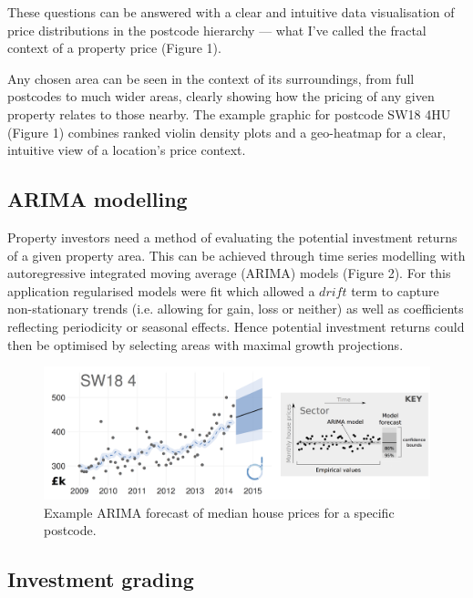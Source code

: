 \documentclass[
10pt, %
a4paper, %
oneside, %
headinclude,footinclude, %
BCOR5mm, %
]{scrartcl}
\begin{document}

These questions can be answered with a clear and intuitive data
visualisation of price distributions in the postcode hierarchy --- what
I've called the fractal context of a property price (Figure 1).

Any chosen area can be seen in the context of its surroundings, from
full postcodes to much wider areas, clearly showing how the pricing of
any given property relates to those nearby.  The example graphic for
postcode SW18 4HU (Figure 1) combines ranked violin density plots and
a geo-heatmap for a clear, intuitive view of a location's price
context.

\vspace{-.5em}
\subsection*{ARIMA modelling}

Property investors need a method of evaluating the potential investment
returns of a given property area. This can be achieved through time
series modelling with autoregressive integrated moving average (ARIMA)
models (Figure 2). For this application regularised models were fit
which allowed a $drift$ term to capture non-stationary trends
(i.e. allowing for gain, loss or neither) as well as coefficients
reflecting periodicity or seasonal effects. Hence potential investment
returns could then be optimised by selecting areas with
maximal growth projections. 

\begin{figure}[h]
\begin{center}
\includegraphics[width=.9\textwidth]{Figures/arima.png}
\caption{Example ARIMA forecast of median house prices for a specific postcode.}
\end{center}
\end{figure}

\vspace{-2em}
\subsection*{Investment grading}
\end{document}
